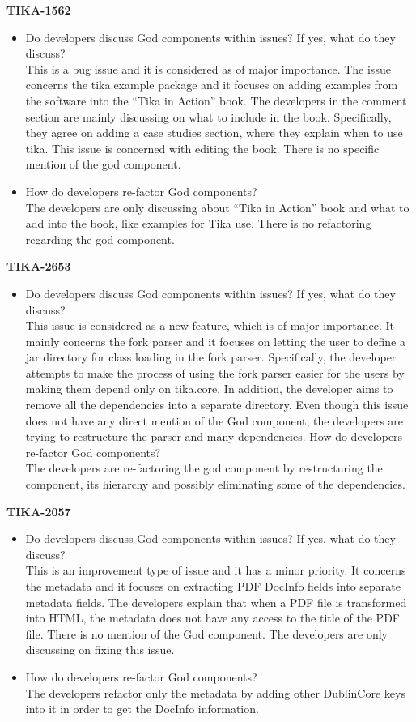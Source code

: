 \documentclass{article}
\begin{document}
\textbf{TIKA-1562}
\begin{itemize}
    \item Do developers discuss God components within issues? If yes, what do they discuss?\\
    This is a bug issue and it is considered as of major importance. The issue concerns the tika.example package and it focuses on adding examples from the software into the “Tika in Action” book. The developers in the comment section are mainly discussing on what to include in the book. Specifically, they agree on adding a case studies section, where they explain when to use tika. This issue is concerned with editing the book. There is no specific mention of the god component. 
    \item How do developers re-factor God components?\\
    The developers are only discussing about “Tika in Action” book and what to add into the book, like examples for Tika use. There is no refactoring regarding the god component.
\end{itemize}

\textbf{TIKA-2653}
\begin{itemize}
    \item Do developers discuss God components within issues? If yes, what do they discuss?\\
    This issue is considered as a new feature, which is of major importance. It mainly concerns the fork parser and it focuses on letting the user to define a jar directory for class loading in the fork parser. Specifically, the developer attempts to make the process of using the fork parser easier for the users by making them depend only on tika.core. In addition, the developer aims to remove all the dependencies into a separate directory.  Even though this issue does not have any direct mention of the God component, the developers are trying to restructure the parser and many dependencies.
    How do developers re-factor God components?\\
    The developers are re-factoring the god component by restructuring the component, its hierarchy and possibly eliminating some of the dependencies.  
\end{itemize}

\textbf{TIKA-2057}
\begin{itemize}
    \item Do developers discuss God components within issues? If yes, what do they discuss?\\
    This is an improvement type of issue and it has a minor priority. It concerns the metadata and it focuses on extracting PDF DocInfo fields into separate metadata fields. The developers explain that when a PDF file is transformed into HTML, the metadata does not have any access to the title of the PDF file. There is no mention of the God component. The developers are only discussing on fixing this issue. 
    \item How do developers re-factor God components?\\
    The developers refactor only the metadata by  adding other DublinCore keys into it in order to get the DocInfo information.
\end{itemize}
\end{document}
